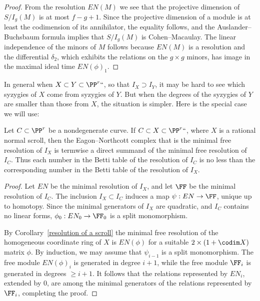 \begin{proof}
From the resolution $EN(M)$ we see that the projective dimension of
$S/I_g(M)$ is at most $f-g+1$. Since the projective dimension of a module
is at least the codimension of its annihilator, the equality follows,
and the Auslander--Buchsbaum formula implies that $S/I_g(M)$ is
%
%
Cohen--Macaulay. The linear independence of the minors of $M$ follows
because $EN(M)$ is a resolution and the differential $\delta_{2}$, which 
exhibits the relations on the $g\times g$ minors, has image in the
maximal ideal time $EN(\phi)_{1}$.
\end{proof}

In general when $X\subset Y\subset \PP^r` `$, so that $I_X \supset I_Y$,
it may be hard to see which syzygies of $X$ come
from syzygies of $Y$. But when the degrees of the syzygies of $Y$ are
smaller than those from $X$, the situation is simpler.
Here is the special case we will use:

\begin{proposition}
Let $C\subset \PP^r$ be
a nondegenerate curve. If $C\subset X
\subset \PP^r` `$, where $X$ is a rational
%
normal scroll, then the Eagon--Northcott complex that is  the minimal
free resolution of $I_X$ is termwise a direct summand
of the minimal free resolution of $I_C$. Thus each number in the Betti table of the
%
resolution of $I_C$ is  
no less than
the corresponding number in the Betti table of the resolution of $I_X$.
\unif
\end{proposition}

\begin{proof}
Let $EN$ be the minimal resolution of $I_X$, and let $\FF$ be the minimal
resolution of $I_C$.
The inclusion $I_X \subset I_C$ induces a map $\psi: EN\to \FF$, unique
up to homotopy. Since the minimal generators of $I_X$ are quadratic,
and $I_C$ contains no linear forms, $\phi_0: EN_0\to \FF_0$ is a split
monomorphism.

By Corollary~\ref{resolution of a scroll} the minimal free resolution of the homogeneous
coordinate ring of $X$ is $EN(\phi)$ for a suitable $2\times (1+\codim X)$ matrix $\phi$.
By induction, we may assume that $\psi_{i-1}$ is a split monomorphism. The
free module $EN(\phi)_{i}$ is generated in
degree $i+1$, while the free module $\FF_i$ is generated in degrees
$\geq i+1$. It follows that the relations
represented by $EN_i$, extended by 0, are among the minimal generators
of the relations represented by $\FF_i$,
completing the proof.
\end{proof}

